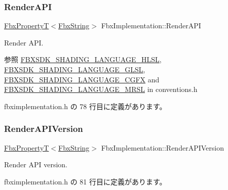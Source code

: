 \subsubsection{\texorpdfstring{Render\+A\+PI}{RenderAPI}}
{\footnotesize\ttfamily \hyperlink{class_fbx_property_t}{Fbx\+PropertyT}$<$\hyperlink{class_fbx_string}{Fbx\+String}$>$ Fbx\+Implementation\+::\+Render\+A\+PI}

Render A\+PI. \begin{DoxySeeAlso}{参照}
\hyperlink{fbxshadingconventions_8h_ac10b54a713e5562fe6572d1a2594288f}{F\+B\+X\+S\+D\+K\+\_\+\+S\+H\+A\+D\+I\+N\+G\+\_\+\+L\+A\+N\+G\+U\+A\+G\+E\+\_\+\+H\+L\+SL}, \hyperlink{fbxshadingconventions_8h_a52222f21db3187bf9ed4986f053aa44f}{F\+B\+X\+S\+D\+K\+\_\+\+S\+H\+A\+D\+I\+N\+G\+\_\+\+L\+A\+N\+G\+U\+A\+G\+E\+\_\+\+G\+L\+SL}, \hyperlink{fbxshadingconventions_8h_a0551f4268e3fc2e0fcd9464297b31b6f}{F\+B\+X\+S\+D\+K\+\_\+\+S\+H\+A\+D\+I\+N\+G\+\_\+\+L\+A\+N\+G\+U\+A\+G\+E\+\_\+\+C\+G\+FX} and \hyperlink{fbxshadingconventions_8h_a7941affa96f6fc8d3345dac506c71ea2}{F\+B\+X\+S\+D\+K\+\_\+\+S\+H\+A\+D\+I\+N\+G\+\_\+\+L\+A\+N\+G\+U\+A\+G\+E\+\_\+\+M\+R\+SL} in conventions.\+h 
\end{DoxySeeAlso}


 fbximplementation.\+h の 78 行目に定義があります。

\mbox{\label{class_fbx_implementation_a66ac67e482f39a4e71389f33f1c69648}} 
\subsubsection{\texorpdfstring{Render\+A\+P\+I\+Version}{RenderAPIVersion}}
{\footnotesize\ttfamily \hyperlink{class_fbx_property_t}{Fbx\+PropertyT}$<$\hyperlink{class_fbx_string}{Fbx\+String}$>$ Fbx\+Implementation\+::\+Render\+A\+P\+I\+Version}



Render A\+PI version. 



 fbximplementation.\+h の 81 行目に定義があります。

\mbox{\label{class_fbx_implementation_a1c5e1e5480c227977a92668d77c13ce8}} 
